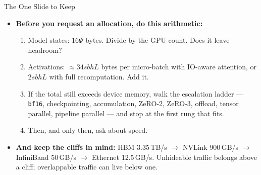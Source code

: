 \begin{frame}{The One Slide to Keep}
  \begin{itemize}\itemsep0.45em
    \item[\textcolor{red}{$\blacktriangleright$}] \textbf{Before you request an allocation, do this arithmetic:}
      \begin{enumerate}\itemsep0.2em\footnotesize
        \item Model states: $16\Psi$ bytes. Divide by the GPU count. Does it leave headroom?
        \item Activations: $\approx 34sbhL$ bytes per micro-batch with IO-aware attention, or $2sbhL$ with full recomputation. Add it.
        \item If the total still exceeds device memory, walk the escalation ladder --- \texttt{bf16}, checkpointing, accumulation, ZeRO-2, ZeRO-3, offload, tensor parallel, pipeline parallel --- and stop at the first rung that fits.
        \item Then, and only then, ask about speed.
      \end{enumerate}
    \item[\textcolor{red}{$\blacktriangleright$}] \textbf{And keep the cliffs in mind:} HBM 3.35\,TB/s $\rightarrow$ NVLink 900\,GB/s $\rightarrow$ InfiniBand 50\,GB/s $\rightarrow$ Ethernet 12.5\,GB/s. Unhideable traffic belongs above a cliff; overlappable traffic can live below one.
  \end{itemize}
\end{frame}

